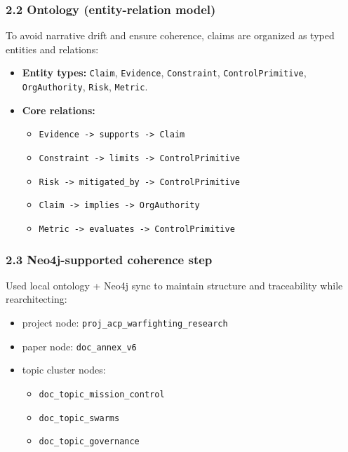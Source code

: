 \documentclass[
]{article}
\providecommand{\tightlist}{%
  \setlength{\itemsep}{0pt}\setlength{\parskip}{0pt}}
\begin{document}
\hypertarget{ontology-entity-relation-model}{%
\subsubsection{2.2 Ontology (entity-relation
model)}\label{ontology-entity-relation-model}}

To avoid narrative drift and ensure coherence, claims are organized as
typed entities and relations:

\begin{itemize}
\tightlist
\item
  \textbf{Entity types:} \texttt{Claim}, \texttt{Evidence},
  \texttt{Constraint}, \texttt{ControlPrimitive}, \texttt{OrgAuthority},
  \texttt{Risk}, \texttt{Metric}.
\item
  \textbf{Core relations:}

  \begin{itemize}
  \tightlist
  \item
    \texttt{Evidence\ -\textgreater{}\ supports\ -\textgreater{}\ Claim}
  \item
    \texttt{Constraint\ -\textgreater{}\ limits\ -\textgreater{}\ ControlPrimitive}
  \item
    \texttt{Risk\ -\textgreater{}\ mitigated\_by\ -\textgreater{}\ ControlPrimitive}
  \item
    \texttt{Claim\ -\textgreater{}\ implies\ -\textgreater{}\ OrgAuthority}
  \item
    \texttt{Metric\ -\textgreater{}\ evaluates\ -\textgreater{}\ ControlPrimitive}
  \end{itemize}
\end{itemize}

\hypertarget{neo4j-supported-coherence-step}{%
\subsubsection{2.3 Neo4j-supported coherence
step}\label{neo4j-supported-coherence-step}}

Used local ontology + Neo4j sync to maintain structure and traceability
while rearchitecting:

\begin{itemize}
\tightlist
\item
  project node: \texttt{proj\_acp\_warfighting\_research}
\item
  paper node: \texttt{doc\_annex\_v6}
\item
  topic cluster nodes:

  \begin{itemize}
  \tightlist
  \item
    \texttt{doc\_topic\_mission\_control}
  \item
    \texttt{doc\_topic\_swarms}
  \item
    \texttt{doc\_topic\_governance}
  \end{itemize}
\end{itemize}
\end{document}
